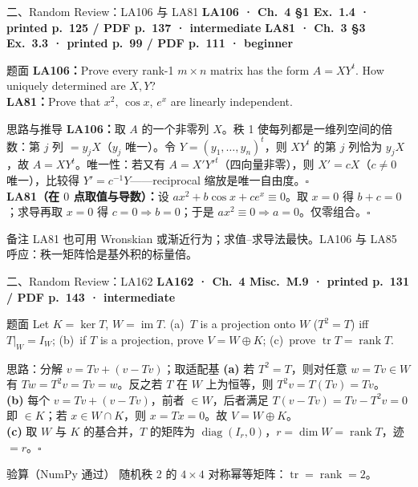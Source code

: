 \documentclass[aspectratio=169,10pt,fontset=none]{ctexbeamer}
\newcommand{\ex}[1]{\textcolor{accent}{\footnotesize\bfseries #1}}
\begin{document}
\begin{frame}[t]{二、Random Review：LA106 与 LA81}
  \leavevmode\ex{LA106 · Ch.~4 §1 Ex.~1.4 · printed p.~125 / PDF p.~137 · intermediate}\quad
  \ex{LA81 · Ch.~3 §3 Ex.~3.3 · printed p.~99 / PDF p.~111 · beginner}
  \begin{block}{\footnotesize 题面}
    \scriptsize \textbf{LA106：}Prove every rank-1 $m\times n$ matrix has the form $A=XY^t$. How uniquely determined are $X,Y$?\\
    \textbf{LA81：}Prove that $x^2$, $\cos x$, $e^x$ are linearly independent.
  \end{block}
  \begin{exampleblock}{\footnotesize 思路与推导}
    \scriptsize
    \textbf{LA106：}取 $A$ 的一个非零列 $X$。秩 1 使每列都是一维列空间的倍数：第 $j$ 列 $=y_jX$（$y_j$ 唯一）。令 $Y=(y_1,\ldots,y_n)^t$，则 $XY^t$ 的第 $j$ 列恰为 $y_jX$，故 $A=XY^t$。唯一性：若又有 $A=X'Y'^t$（四向量非零），则 $X'=cX$（$c\ne0$ 唯一），比较得 $Y'=c^{-1}Y$——reciprocal 缩放是唯一自由度。$\square$\\[2pt]
    \textbf{LA81（在 $0$ 点取值与导数）：}设 $ax^2+b\cos x+ce^x\equiv0$。取 $x=0$ 得 $b+c=0$；求导再取 $x=0$ 得 $c=0\Rightarrow b=0$；于是 $ax^2\equiv0\Rightarrow a=0$。仅零组合。$\square$
  \end{exampleblock}
  \begin{block}{\footnotesize 备注}
    \scriptsize LA81 也可用 Wronskian 或渐近行为；求值--求导法最快。LA106 与 LA85 呼应：秩一矩阵恰是基外积的标量倍。
  \end{block}
\end{frame}

\begin{frame}[t]{二、Random Review：LA162}
  \leavevmode\ex{LA162 · Ch.~4 Misc.\ M.9 · printed p.~131 / PDF p.~143 · intermediate}
  \begin{block}{\footnotesize 题面}
    \scriptsize Let $K=\ker T$, $W=\operatorname{im}T$. (a)~$T$ is a projection onto $W$ ($T^2=T$) iff $T|_W=I_W$; (b)~if $T$ is a projection, prove $V=W\oplus K$; (c)~prove $\operatorname{tr}T=\operatorname{rank}T$.
  \end{block}
  \begin{exampleblock}{\footnotesize 思路：分解 $v=Tv+(v-Tv)$；取适配基}
    \scriptsize
    \textbf{(a)} 若 $T^2=T$，则对任意 $w=Tv\in W$ 有 $Tw=T^2v=Tv=w$。反之若 $T$ 在 $W$ 上为恒等，则 $T^2v=T(Tv)=Tv$。\\
    \textbf{(b)} 每个 $v=Tv+(v-Tv)$，前者 $\in W$，后者满足 $T(v-Tv)=Tv-T^2v=0$ 即 $\in K$；若 $x\in W\cap K$，则 $x=Tx=0$。故 $V=W\oplus K$。\\
    \textbf{(c)} 取 $W$ 与 $K$ 的基合并，$T$ 的矩阵为 $\operatorname{diag}(I_r,0)$，$r=\dim W=\operatorname{rank}T$，迹 $=r$。$\square$
  \end{exampleblock}
  \begin{block}{\footnotesize 验算（NumPy 通过）}
    \scriptsize 随机秩 2 的 $4\times4$ 对称幂等矩阵：$\operatorname{tr}=\operatorname{rank}=2$。
  \end{block}
\end{frame}
\end{document}
